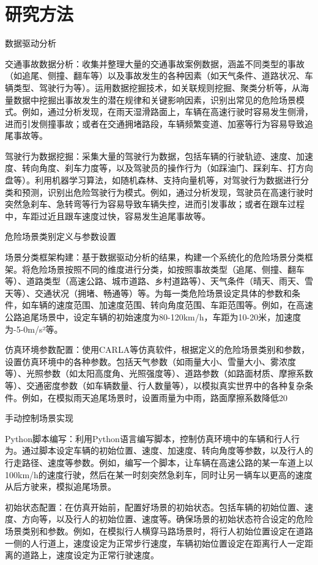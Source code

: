 \section{研究方法}

数据驱动分析

交通事故数据分析：收集并整理大量的交通事故案例数据，涵盖不同类型的事故（如追尾、侧撞、翻车等）以及事故发生的各种因素（如天气条件、道路状况、车辆类型、驾驶行为等）。运用数据挖掘技术，如关联规则挖掘、聚类分析等，从海量数据中挖掘出事故发生的潜在规律和关键影响因素，识别出常见的危险场景模式。例如，通过分析发现，在雨天湿滑路面上，车辆在高速行驶时容易发生侧滑，进而引发侧撞事故；或者在交通拥堵路段，车辆频繁变道、加塞等行为容易导致追尾事故等。

驾驶行为数据挖掘：采集大量的驾驶行为数据，包括车辆的行驶轨迹、速度、加速度、转向角度、刹车力度等，以及驾驶员的操作行为（如踩油门、踩刹车、打方向盘等）。利用机器学习算法，如随机森林、支持向量机等，对驾驶行为数据进行分类和预测，识别出危险驾驶行为模式。例如，通过分析发现，驾驶员在高速行驶时突然急刹车、急转弯等行为容易导致车辆失控，进而引发事故；或者在跟车过程中，车距过近且跟车速度过快，容易发生追尾事故等。

危险场景类别定义与参数设置

场景分类框架构建：基于数据驱动分析的结果，构建一个系统化的危险场景分类框架。将危险场景按照不同的维度进行分类，如按照事故类型（追尾、侧撞、翻车等）、道路类型（高速公路、城市道路、乡村道路等）、天气条件（晴天、雨天、雪天等）、交通状况（拥堵、畅通等）等。为每一类危险场景设定具体的参数和条件，如车辆的速度范围、加速度范围、转向角度范围、车距范围等。例如，在高速公路追尾场景中，设定车辆的初始速度为80-120km/h，车距为10-20米，加速度为-5-0m/s²等。

仿真环境参数配置：使用CARLA等仿真软件，根据定义的危险场景类别和参数，设置仿真环境中的各种参数。包括天气参数（如雨量大小、雪量大小、雾浓度等）、光照参数（如太阳高度角、光照强度等）、道路参数（如路面材质、摩擦系数等）、交通密度参数（如车辆数量、行人数量等），以模拟真实世界中的各种复杂条件。例如，在模拟雨天追尾场景时，设置雨量为中雨，路面摩擦系数降低20%

手动控制场景实现

Python脚本编写：利用Python语言编写脚本，控制仿真环境中的车辆和行人行为。通过脚本设定车辆的初始位置、速度、加速度、转向角度等参数，以及行人的行走路径、速度等参数。例如，编写一个脚本，让车辆在高速公路的某一车道上以100km/h的速度行驶，然后在某一时刻突然急刹车，同时让另一辆车以更高的速度从后方驶来，模拟追尾场景。

初始状态配置：在仿真开始前，配置好场景的初始状态。包括车辆的初始位置、速度、方向等，以及行人的初始位置、速度等。确保场景的初始状态符合设定的危险场景类别和参数。例如，在模拟行人横穿马路场景时，将行人初始位置设定在道路一侧的人行道上，速度设定为正常步行速度，车辆初始位置设定在距离行人一定距离的道路上，速度设定为正常行驶速度。

